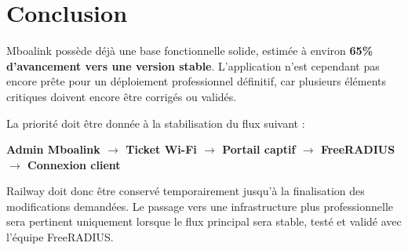 \documentclass[12pt,a4paper]{article}
\begin{document}
\section{Conclusion}

Mboalink possède déjà une base fonctionnelle solide, estimée à environ \textbf{65\% d'avancement vers une version stable}. L'application n'est cependant pas encore prête pour un déploiement professionnel définitif, car plusieurs éléments critiques doivent encore être corrigés ou validés.

La priorité doit être donnée à la stabilisation du flux suivant :

\begin{center}
\textbf{Admin Mboalink $\rightarrow$ Ticket Wi-Fi $\rightarrow$ Portail captif $\rightarrow$ FreeRADIUS $\rightarrow$ Connexion client}
\end{center}

Railway doit donc être conservé temporairement jusqu'à la finalisation des modifications demandées. Le passage vers une infrastructure plus professionnelle sera pertinent uniquement lorsque le flux principal sera stable, testé et validé avec l'équipe FreeRADIUS.
\end{document}

